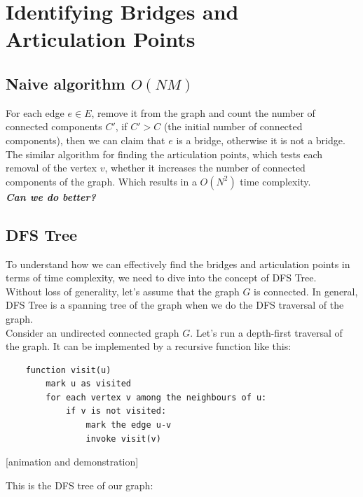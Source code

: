 \documentclass{article}
\begin{document}
\section{Identifying Bridges and Articulation Points}

\subsection{Naive algorithm $O(NM)$}

For each edge $e \in E$, remove it from the graph and count the number of connected components $C'$, if $C' > C$ (the initial number of connected components), then we can claim that $e$ is a bridge, otherwise it is not a bridge.\\

The similar algorithm for finding the articulation points, which tests each removal of the vertex $v$, whether it increases the number of connected components of the graph. Which results in a $O(N^2)$ time complexity.\\

\textbf{\emph{Can we do better?}}
\subsection{DFS Tree}

To understand how we can effectively find the bridges and articulation points in terms of time complexity, we need to dive into the concept of DFS Tree.\\

Without loss of generality, let's assume that the graph $G$ is connected. In general, DFS Tree is a spanning tree of the graph when we do the DFS traversal of the graph.\\

Consider an undirected connected graph $G$. Let's run a depth-first traversal of the graph. It can be implemented by a recursive function like this:

\begin{lstlisting}
    function visit(u)
        mark u as visited
        for each vertex v among the neighbours of u:
            if v is not visited:
                mark the edge u-v
                invoke visit(v)
\end{lstlisting}

[animation and demonstration]\\

\newpage

This is the DFS tree of our graph:
\end{document}
